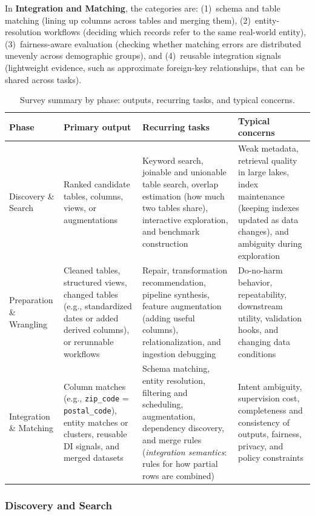 \documentclass[sigconf,nonacm]{acmart}
\newcommand{\tbl}{%
  \scriptsize
  \setlength{\tabcolsep}{4pt}%
  \renewcommand{\arraystretch}{1.12}%
}
\begin{document}
In \textbf{Integration and Matching}, the categories are: (1)~schema and table matching (lining up columns across tables and merging them), (2)~entity-resolution workflows (deciding which records refer to the same real-world entity), (3)~fairness-aware evaluation (checking whether matching errors are distributed unevenly across demographic groups), and (4)~reusable integration signals (lightweight evidence, such as approximate foreign-key relationships, that can be shared across tasks).

\begin{table}[!htbp]
\centering
\caption{Survey summary by phase: outputs, recurring tasks, and typical concerns.}
\label{tab:phase-summary}
\tbl
\begin{tabularx}{\textwidth}{@{}p{30mm}p{34mm}Y p{42mm}@{}}
\toprule
\textbf{Phase} & \textbf{Primary output} & \textbf{Recurring tasks} & \textbf{Typical concerns} \\
\midrule
Discovery \& Search &
Ranked candidate tables, columns, views, or augmentations &
Keyword search, joinable and unionable table search, overlap estimation (how much two tables share), interactive exploration, and benchmark construction &
Weak metadata, retrieval quality in large lakes, index maintenance (keeping indexes updated as data changes), and ambiguity during exploration \\
\addlinespace[0.25em]
Preparation \& Wrangling &
Cleaned tables, structured views, changed tables (e.g., standardized dates or added derived columns), or rerunnable workflows &
Repair, transformation recommendation, pipeline synthesis, feature augmentation (adding useful columns), relationalization, and ingestion debugging &
Do-no-harm behavior, repeatability, downstream utility, validation hooks, and changing data conditions \\
\addlinespace[0.25em]
Integration \& Matching &
Column matches (e.g., \texttt{zip\_code} = \texttt{postal\_code}), entity matches or clusters, reusable DI signals, and merged datasets &
Schema matching, entity resolution, filtering and scheduling, augmentation, dependency discovery, and merge rules (\emph{integration semantics}: rules for how partial rows are combined) &
Intent ambiguity, supervision cost, completeness and consistency of outputs, fairness, privacy, and policy constraints \\
\bottomrule
\end{tabularx}
\end{table}

\subsubsection{Discovery and Search}
\end{document}
